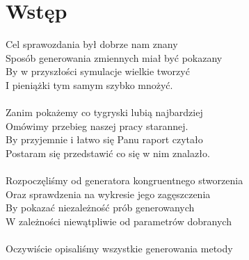 \documentclass[12pt]{mwrep}
\begin{document}
	\section{Wstęp}
	\noindent Cel sprawozdania był dobrze nam znany\\
	Sposób generowania zmiennych miał być pokazany\\
	By w przyszłości symulacje wielkie tworzyć\\
	I pieniążki tym samym szybko mnożyć.\\
	\\
	Zanim pokażemy co tygryski lubią najbardziej\\
	Omówimy przebieg naszej pracy starannej.\\
	By przyjemnie i łatwo się Panu raport czytało\\
	Postaram się przedstawić co się  w nim znalazło.\\
	\\
	Rozpoczęliśmy od generatora kongruentnego stworzenia\\
	Oraz sprawdzenia na wykresie jego zagęszczenia\\
	By pokazać niezależność prób generowanych\\
	W zależności niewątpliwie od parametrów dobranych\\
	\\
	Oczywiście opisaliśmy wszystkie generowania metody\\
\end{document}
